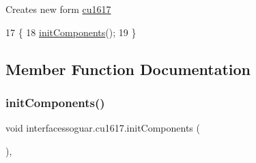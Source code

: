 Creates new form \mbox{\hyperlink{classinterfacessoguar_1_1cu1617}{cu1617}} 
\begin{DoxyCode}
17                     \{
18         \mbox{\hyperlink{classinterfacessoguar_1_1cu1617_a9959a875cf17a99c7e4e8d8bbbc8924f}{initComponents}}();
19     \}
\end{DoxyCode}


\subsection{Member Function Documentation}
\mbox{\label{classinterfacessoguar_1_1cu1617_a9959a875cf17a99c7e4e8d8bbbc8924f}} 
\subsubsection{\texorpdfstring{init\+Components()}{initComponents()}}
{\footnotesize\ttfamily void interfacessoguar.\+cu1617.\+init\+Components (\begin{DoxyParamCaption}{ }\end{DoxyParamCaption})\hspace{0.3cm}{\ttfamily [inline]}, {\ttfamily [private]}}

